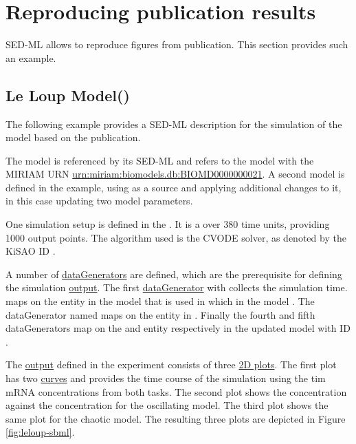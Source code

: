 \pagebreak
\section{Reproducing publication results}
SED-ML allows to reproduce figures from publication. This section provides such an example.

\subsection{Le Loup Model()}
\label{example:leloup_sbml}
The following example provides a SED-ML description for the simulation of the model based on the publication\cite{LeLoup1999}.

The model is referenced by its SED-ML \hyperref[sec:id]{}  and refers to the model with the MIRIAM URN \url{urn:miriam:biomodels.db:BIOMD0000000021}. A second model is defined in the example, using  as a source and applying additional changes to it, in this case updating two model parameters.

One simulation setup is defined in the . It is a  over 380 time units, providing 1000 output points. The algorithm used is the CVODE solver, as denoted by the KiSAO ID .

A number of \hyperref[class:dataGenerator]{dataGenerators} are defined, which are the prerequisite for defining the simulation \hyperref[class:output]{output}. The first \hyperref[class:dataGenerator]{dataGenerator} with \hyperref[sec:id]{}  collects the simulation time.  maps on the  entity in the model that is used in  which in the model . The dataGenerator named  maps on the  entity in . Finally  the fourth and fifth dataGenerators map on the  and  entity respectively in the updated model with ID .

The \hyperref[class:output]{output} defined in the experiment consists of three \hyperref[class:plot2D]{2D plots}. The first plot has two \hyperref[class:curve]{curves} and provides the time course of the simulation using the tim mRNA concentrations from both tasks. The second plot shows the  concentration against the  concentration for the oscillating model. The third plot shows the same plot for the chaotic model. The resulting three plots are depicted in Figure \ref{fig:leloup-sbml}. 

